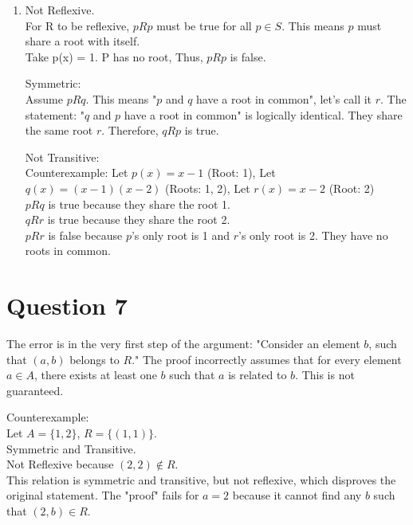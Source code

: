 \documentclass[twoside]{article}
\begin{document}
\begin{enumerate}
    \item[(a.)] Not Reflexive. \\
                For R to be reflexive, $p R p$ must be true for all $p \in S$. This means $p$ must share a root with itself. \\
                Take p(x) = 1. P has no root,  Thus, $p R p$ is false.

                Symmetric: \\
                Assume $p R q$. This means "$p$ and $q$ have a root in common", let's call it $r$. 
                The statement:  "$q$ and $p$ have a root in common" is logically identical. They share the same root $r$. Therefore, $q R p$ is true.

                Not Transitive: \\
                Counterexample: Let $p(x) = x-1$ (Root: 1), Let $q(x) = (x-1)(x-2)$ (Roots: 1, 2), Let $r(x) = x-2$ (Root: 2) \\
                $p R q$ is true because they share the root 1. \\
                $q R r$ is true because they share the root 2. \\
                $p R r$ is false because $p$'s only root is 1 and $r$'s only root is 2. They have no roots in common.
\end{enumerate}

\section*{Question 7}

    The error is in the very first step of the argument: "Consider an element $b$, such that $(a, b)$ belongs to $R$."
    The proof incorrectly assumes that for every element $a \in A$, there exists at least one $b$ such that $a$ is related to $b$. This is not guaranteed.
    
    Counterexample: \\
    Let $A = \{1, 2\}$, $R = \{(1, 1)\}$. \\
    Symmetric and Transitive. \\
    Not Reflexive because $(2, 2) \notin R$. \\
    This relation is symmetric and transitive, but not reflexive, which disproves the original statement. The "proof" fails for $a=2$ because it cannot find any $b$ such that $(2, b) \in R$.
\end{document}
